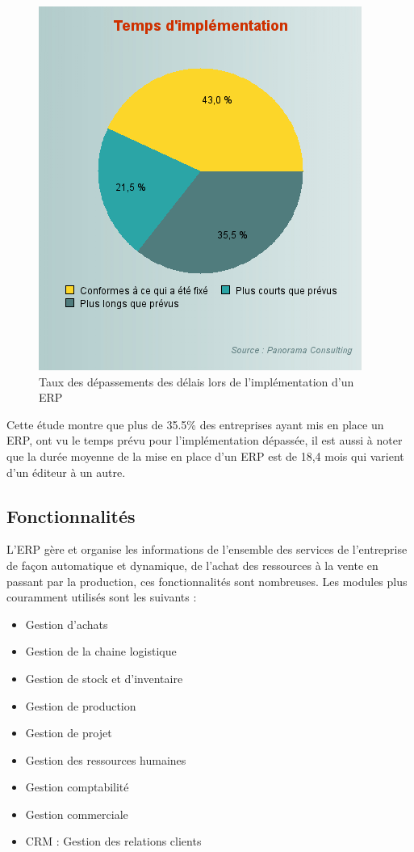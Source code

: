         \begin{figure}[H]
            \centering
                \includegraphics[scale=0.65]{chapitre2/graph-taux-implementation.png}
            \caption{Taux des dépassements des délais lors de l’implémentation d’un ERP}
        \end{figure} 

        Cette étude montre que plus de 35.5\% des entreprises ayant mis en place un ERP, ont vu le temps prévu pour l’implémentation dépassée, il est aussi à noter que la durée moyenne de la mise en place d’un ERP est de 18,4 mois qui varient d’un éditeur à un autre.

    \subsection{Fonctionnalités}
        L’ERP gère et organise les informations de l’ensemble des services de l’entreprise de façon automatique et dynamique, de l’achat des ressources à la vente en passant par la production, ces fonctionnalités sont nombreuses. Les modules plus couramment utilisés sont les suivants : \\
        
        \begin{itemize}
            \item Gestion d’achats
            \item Gestion de la chaine logistique
            \item Gestion de stock et d’inventaire
            \item Gestion de production
            \item Gestion de projet
            \item Gestion des ressources humaines 
            \item Gestion comptabilité
            \item Gestion commerciale
            \item CRM : Gestion des relations clients\\
        \end{itemize}

